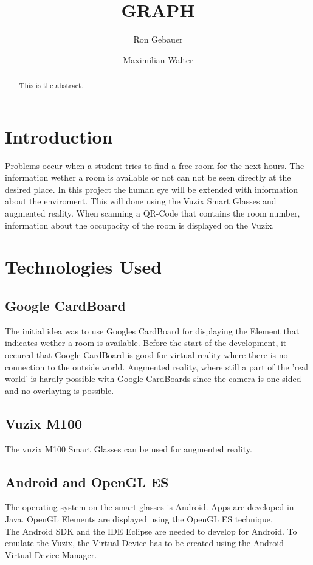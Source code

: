 \documentclass[]{article}
\title{GRAPH}
\author{Ron Gebauer \and Maximilian Walter}
\begin{document}
\maketitle

\begin{abstract}
This is the abstract.
\end{abstract}

\section{Introduction}
Problems occur when a student tries to find a free room for the next hours. The information wether a room is available or not can not be seen directly at the desired place. In this project the human eye will be extended with information about the enviroment. This will done using the Vuzix Smart Glasses and augmented reality. When scanning a QR-Code that contains the room number, information about the occupacity of the room is displayed on the Vuzix. 
\section{Technologies Used}
\subsection{Google CardBoard}
The initial idea was to use Googles CardBoard for displaying the Element that indicates wether a room is available. Before the start of the development, it occured that Google CardBoard is good for virtual reality where there is no connection to the outside world. Augmented reality, where still a part of the 'real world' is hardly possible with Google CardBoards since the camera is one sided and no overlaying is possible.   
\subsection{Vuzix M100}
The vuzix M100 Smart Glasses can be used for augmented reality. 
\subsection{Android and OpenGL ES}
The operating system on the smart glasses is Android. Apps are developed in Java. OpenGL Elements are displayed using the OpenGL ES technique. 
\\
The Android SDK and the IDE Eclipse are needed to develop for Android. To emulate the Vuzix, the Virtual Device has to be created using the Android Virtual Device Manager. 
\end{document}
